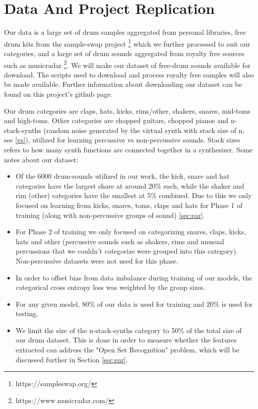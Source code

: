 \documentclass[\main/thesis.tex]{subfiles}
\begin{document}
\section{Data And Project Replication}
\label{data}
Our data is a large set of drum samples aggregated from personal libraries, free drum kits from the sample-swap project \footnote{https://sampleswap.org/} which we further processed to suit our categories, and a large set of drum sounds aggregated from royalty free sources such as musicradar \footnote{https://www.musicradar.com/}. We will make our dataset of free-drum sounds available for download. The scripts used to download and process royalty free samples will also be made available. Further information about downloading our dataset can be found on this project's github page. 

Our drum categories are claps, hats, kicks, rims/other, shakers, snares, mid-toms and high-toms. Other categories are chopped guitars, chopped pianos and n-stack-synths (random noise generated by the virtual synth with stack size of n, see \ref{vs}), utilized for learning percussive vs non-percussive sounds. Stack sizes refers to how many synth functions are connected together in a synthesizer.
Some notes about our dataset:


\begin{itemize}
\item Of the 6000 drum-sounds utilized in our work, the kick, snare and hat categories have the largest share at around 20\% each, while the shaker and rim (other) categories have the smallest at 5\% combined. Due to this we only focused on learning from kicks, snares, toms, claps and hats for Phase 1 of training (along with non-percussive groups of sound) \ref{sec:ear}.
\item For Phase 2 of training we only focused on categorizing snares, claps, kicks, hats and other (percussive sounds such as shakers, rims and unusual percussions that we couldn't categorize were grouped into this category). Non-percussive datasets were not used for this phase. 
\item In order to offset bias from data imbalance during training of our models, the categorical cross entropy loss was weighted by the group sizes. 
\item For any given model, 80\% of our data is used for training and 20\% is used for testing. 

\item We limit the size of the n-stack-synths category to 50\% of the total size of our drum dataset. This is done in order to measure whether the features extracted can address the "Open Set Recognition" problem, which will be discussed further in Section \ref{sec:ear}.
\end{itemize}
\end{document}
